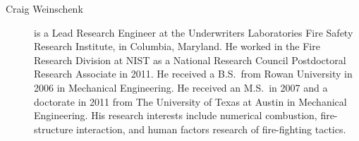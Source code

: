 \begin{description}

\item[Craig Weinschenk] is a Lead Research Engineer at the Underwriters Laboratories Fire Safety Research Institute, in Columbia, Maryland. He worked in the Fire Research Division at NIST as a National Research Council Postdoctoral Research Associate in 2011. He received a B.S.~from Rowan University in 2006 in Mechanical Engineering. He received an M.S.~in 2007 and a doctorate in 2011 from The University of Texas at Austin in Mechanical Engineering. His research interests include numerical combustion, fire-structure interaction, and human factors research of fire-fighting tactics.

\end{description}


